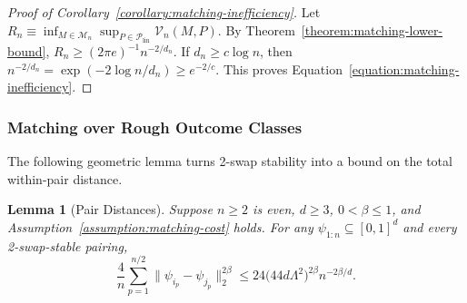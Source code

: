 \documentclass[letterpaper,12pt]{article}
\newtheorem{lem}[thm]{Lemma}
\theoremstyle{definition}
\numberwithin{equation}{section}
\newcommand{\mc}{\mathcal}
\begin{document}
\begin{proof}[Proof of Corollary~\ref{corollary:matching-inefficiency}]
Let $R_n\equiv\inf_{M\in\mathcal M_n}\sup_{P\in\mathcal P_{\mathrm{lin}}}\mc V_n(M,P)$.
By Theorem~\ref{theorem:matching-lower-bound}, $R_n\geq(2\pi e)^{-1}n^{-2/d_n}$.
If $d_n\geq c\log n$, then $n^{-2/d_n}=\exp(-2\log n/d_n)\geq e^{-2/c}$.
This proves Equation~\eqref{equation:matching-inefficiency}.
\end{proof}

\subsubsection{Matching over Rough Outcome Classes}

The following geometric lemma turns 2-swap stability into a bound on the total within-pair distance.

\begin{lem}[Pair Distances]\label{lemma:proof-stable-pair-distance}
Suppose $n\geq2$ is even, $d\geq3$, $0<\beta\leq1$, and Assumption~\ref{assumption:matching-cost} holds.
For any $\psi_{1:n} \subseteq [0,1]^d$ and every 2-swap-stable pairing,
\begin{equation}
\frac{4}{n} \sum_{p=1}^{n/2} \|\psi_{i_p}-\psi_{j_p}\|_2^{2\beta} \leq 24\bigl(44d\Lambda^2\bigr)^{2\beta} n^{-2\beta/d}.
\end{equation}
\end{lem}
\end{document}
